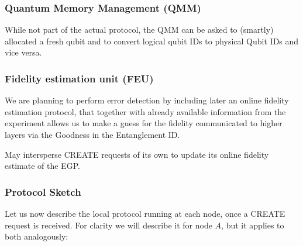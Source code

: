 \documentclass{article}
\begin{document}
\subsubsection{Quantum Memory Management (QMM)}
While not part of the actual protocol, the QMM can be asked to (smartly) allocated a fresh qubit and to convert logical qubit IDs to physical Qubit IDs and vice versa.

\subsubsection{Fidelity estimation unit (FEU)}
We are planning to perform error detection by including later an online fidelity estimation protocol, that together with already available information from the experiment allows us to make a guess for the fidelity communicated to higher layers via the Goodness in the Entanglement ID.

May intersperse CREATE requests of its own to update its online fidelity estimate of the EGP.

\subsubsection{Protocol Sketch}

Let us now describe the local protocol running at each node, once a CREATE request is received. For clarity we will describe it for node $A$, but
it applies to both analogously:
\end{document}
